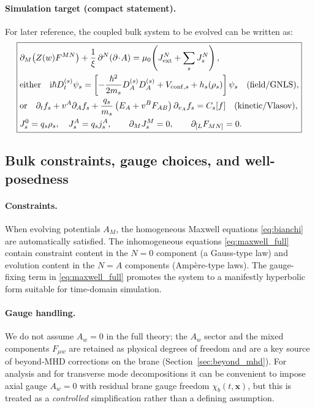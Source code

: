 \documentclass[11pt]{article}
\newcommand{\ii}{\mathrm{i}}
\newcommand{\x}{\mathbf{x}}     %
\newcommand{\A}{A}              %
\newcommand{\F}{F}              %
\newcommand{\J}{J}              %
\newcommand{\Js}{J_s}           %
\newcommand{\Z}{Z}              %
\newcommand{\muzero}{\mu_0}
\begin{document}
\paragraph{Simulation target (compact statement).}
For later reference, the coupled bulk system to be evolved can be written as:
\begin{equation}
\boxed{
\begin{aligned}
&\partial_M\!\left(\Z(w)\F^{MN}\right)
+\frac{1}{\xi}\,\partial^N(\partial\!\cdot\!\A)
=\muzero\!\left(\J_{\rm ext}^N+\sum_s \Js^N\right),
\\
&\text{either}\quad
\ii\hbar D_t^{(s)}\psi_s
=
\left[
-\frac{\hbar^2}{2m_s}D_A^{(s)}D_A^{(s)}
+V_{{\rm conf},s}+h_s(\rho_s)
\right]\psi_s
\quad (\text{field/GNLS}),
\\
&\text{or}\quad
\partial_t f_s + v^A\partial_A f_s
+ \frac{q_s}{m_s}\left(E_A + v^B F_{AB}\right)\partial_{v_A} f_s
= C_s[f]
\quad (\text{kinetic/Vlasov}),
\\
&\Js^0=q_s\rho_s,\quad \Js^A=q_s j_s^A,
\qquad
\partial_M \Js^M=0,
\qquad
\partial_{[L}\F_{MN]}=0.
\end{aligned}
}
\label{eq:full_system_box}
\end{equation}

\subsection{Bulk constraints, gauge choices, and well-posedness}
\label{sec:constraints_gauge_wellposed}

\paragraph{Constraints.}
When evolving potentials \(\A_M\), the homogeneous Maxwell equations
\eqref{eq:bianchi} are automatically satisfied. The inhomogeneous equations
\eqref{eq:maxwell_full} contain constraint content in the \(N=0\) component (a
Gauss-type law) and evolution content in the \(N=A\) components (Amp\`ere-type
laws). The gauge-fixing term in \eqref{eq:maxwell_full} promotes the system to a
manifestly hyperbolic form suitable for time-domain simulation.

\paragraph{Gauge handling.}
We do not assume \(A_w=0\) in the full theory; the \(A_w\) sector and the mixed
components \(\F_{\mu w}\) are retained as physical degrees of freedom and are a key
source of beyond-MHD corrections on the brane (Section~\ref{sec:beyond_mhd}). For
analysis and for transverse mode decompositions it can be convenient to impose
axial gauge \(A_w=0\) with residual brane gauge freedom \(\chi_b(t,\x)\), but this
is treated as a \emph{controlled} simplification rather than a defining assumption.
\end{document}
